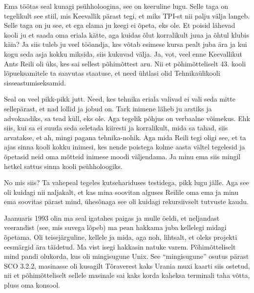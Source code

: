
Ema töötas seal kunagi psühholoogina, see on keeruline lugu. Selle taga on tegelikult see stiil, mis  Keevallik pärast tegi, et miks TPI-st nii palju välja langeb. Selle taga on ju see, et ega elama ju keegi ei õpeta, eks ole. Et poisid lähevad  kooli ju et saada oma eriala kätte, aga kuidas õlut korralikult juua ja õhtul klubis käia? Ja siis tuleb ju veel tööandja, kes võtab esimese kursa pealt juba ära ja kui kogu seda asja kokku miksida, siis kukuvad välja. Ja, vot, veel enne Keevallikut Ants Reili oli üks, kes sai sellest põhimõttest aru. Nii et põhimõtteliselt 43. kooli lõpueksamitele ta saavutas staatuse, et need ühtlasi olid Tehnikaülikooli sisseastumiseksamid. 

Seal on veel pikk-pikk jutt. Need, kes tehnika eriala valivad ei vali seda mitte sellepärast, et nad lollid ja jobud on. Tark inimene läheb ju arstiks ja advokaadiks, sa tead küll, eks ole. Aga tegelik põhjus on verbaalne võimekus. Ehk siis, kui sa ei suuda seda seletada kiiresti ja korralikult, mida sa tahad, siis arvatakse, et ah, mingi pagana tehnika-nohik. Aga mida Reili tegi oligi see, et ta ajas sinna kooli kokku inimesi, kes nende poistega kolme aasta vältel tegelesid ja õpetasid neid oma mõtteid inimese moodi väljendama. Ja minu ema siis mingil hetkel sattus sinna kooli psühholoogiks. 


No mis siis? Ta vahepeal tegeles kutsehariduses testidega, pikk lugu jälle. Aga see oli kuidagi nii naljakalt, et kas mina soovitan alguses Reilile oma ema ja minu ema soovitas pärast mind, ühesõnaga see oli kuidagi rekursiivselt tutvuste kaudu. 

Jaanuaris 1993 olin ma seal igatahes paigas ja mulle öeldi, et neljandast veerandist (see, mis suvega lõpeb) ma pean hakkama juba kellelegi midagi õpetama. Oli teisejärguline, kellele ja mida, aga noh, lihtsalt, et oleks projekti eesmärgid ära täidetud. Ma vist isegi hakkasin natuke varem. Põhimõtteliselt mind pandi olukorda, kus oli mingisugune Unix. See \enquote{mingisugune} osutus pärast SCO 3.2.2, masinasse oli kusagilt Tõraverest kaks Urania muxi kaarti siis ostetud, nii et põhimõtteliselt sellele masinale sai kaks korda kaheksa terminali taha võtta, pluss oma konsool.  

